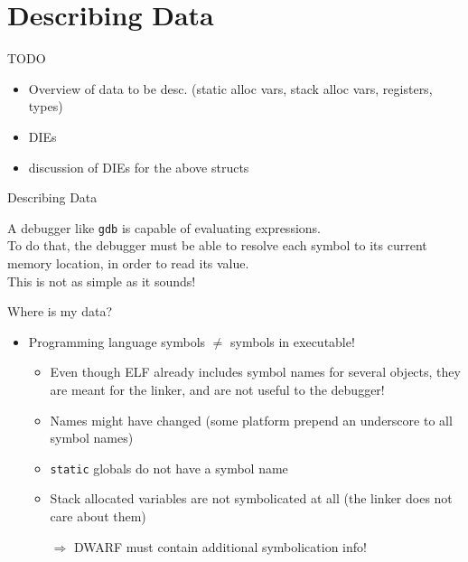 
\section{Describing Data}


\begin{frame}{TODO}
\begin{itemize}
\item Overview of data to be desc. (static alloc vars, stack alloc vars, registers, types)
\item DIEs
\item discussion of DIEs for the above structs
\end{itemize}
\end{frame}


\begin{frame}{Describing Data}
\begin{center}
A debugger like \texttt{gdb} is capable of \alert{evaluating expressions}.\\
\medskip
To do that, the debugger must be able to resolve each symbol to its current memory location,
in order to read its value.\\
\bigskip
\large
This is not as simple as it sounds!
\end{center}
\end{frame}


\begin{frame}{Where is my data?}
\begin{itemize}
\item Programming language symbols $\ne$ symbols in executable!
\medskip
	\begin{itemize}
	\normalsize
	\item Even though ELF already includes symbol names for several objects, they are meant for the \alert{linker}, and are not useful to the debugger!
	\item Names might have changed (some platform prepend an underscore to all symbol names)
	\item \texttt{static} globals do not have a symbol name
	\item Stack allocated variables are not symbolicated at all (the linker does not care about them)
	\medskip
	\item[$\Rightarrow$] DWARF must contain additional symbolication info!
	\end{itemize}
\end{itemize}
\end{frame}


